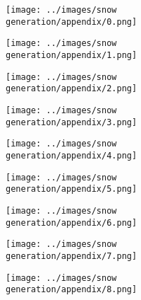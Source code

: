 \begin{figure}[H]
  \centering
 \captionsetup[subfigure]{labelformat=empty}
  \begin{subfigure}[b]{0.1\textwidth}
      \centering
      \texttt{[image: ../images/snow generation/appendix/0.png]}
  \end{subfigure}
  \hspace{1em}%
  \begin{subfigure}[b]{0.1\textwidth}
      \centering
      \texttt{[image: ../images/snow generation/appendix/1.png]}
  \end{subfigure}
  \hspace{1em}%
  \begin{subfigure}[b]{0.1\textwidth}
      \centering
      \texttt{[image: ../images/snow generation/appendix/2.png]}
  \end{subfigure}
  \hspace{1em}%
  \begin{subfigure}[b]{0.1\textwidth}
   \centering
   \texttt{[image: ../images/snow generation/appendix/3.png]}
 \end{subfigure}
 \hspace{1em}%
 \begin{subfigure}[b]{0.1\textwidth}
   \centering
   \texttt{[image: ../images/snow generation/appendix/4.png]}
 \end{subfigure}
 \hspace{1em}%
 \begin{subfigure}[b]{0.1\textwidth}
   \centering
   \texttt{[image: ../images/snow generation/appendix/5.png]}
 \end{subfigure}
 \hspace{1em}%
 \begin{subfigure}[b]{0.1\textwidth}
   \centering
   \texttt{[image: ../images/snow generation/appendix/6.png]}
 \end{subfigure}
 \hspace{1em}%
 \begin{subfigure}[b]{0.1\textwidth}
  \centering
  \texttt{[image: ../images/snow generation/appendix/7.png]}
\end{subfigure}
\hspace{1em}%
 \begin{subfigure}[b]{0.1\textwidth}
 \centering
 \texttt{[image: ../images/snow generation/appendix/8.png]}
 \end{subfigure}

\end{figure}
